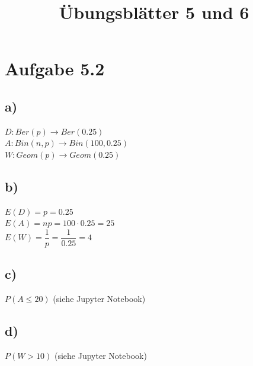 \documentclass{article}
\title{Übungsblätter 5 und 6}
\begin{document}
\maketitle

\section*{Aufgabe 5.2}
\subsection*{a)}
$D : Ber(p) \rightarrow Ber(0.25)$\\
$A : Bin(n,p) \rightarrow Bin(100,0.25)$\\
$W : Geom(p) \rightarrow Geom(0.25)$\\
\subsection*{b)}
$E(D) = p = 0.25$\\
$E(A) = np = 100 \cdot 0.25 = 25$\\
$E(W) = \dfrac{1}{p} = \dfrac{1}{0.25} = 4$\\
\subsection*{c)}
$P(A \leq 20)$ (siehe Jupyter Notebook)\\
\subsection*{d)}
$P(W > 10)$ (siehe Jupyter Notebook)\\
\end{document}
